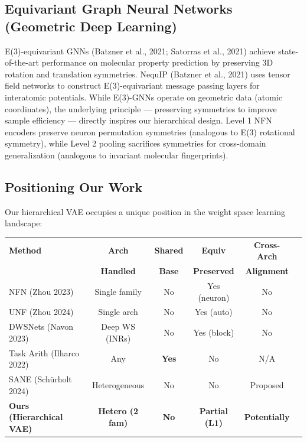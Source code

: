 \subsection{Equivariant Graph Neural Networks (Geometric Deep Learning)}

E(3)-equivariant GNNs (Batzner et al., 2021; Satorras et al., 2021) achieve state-of-the-art performance on molecular property prediction by preserving 3D rotation and translation symmetries. NequIP (Batzner et al., 2021) uses tensor field networks to construct E(3)-equivariant message passing layers for interatomic potentials. While E(3)-GNNs operate on geometric data (atomic coordinates), the underlying principle --- preserving symmetries to improve sample efficiency --- directly inspires our hierarchical design. Level 1 NFN encoders preserve neuron permutation symmetries (analogous to E(3) rotational symmetry), while Level 2 pooling sacrifices symmetries for cross-domain generalization (analogous to invariant molecular fingerprints).

\subsection{Positioning Our Work}

Our hierarchical VAE occupies a unique position in the weight space learning landscape:

\begin{table}[h]
\centering
\small
\begin{tabular}{lccccc}
\toprule
\textbf{Method} & \textbf{Arch} & \textbf{Shared} & \textbf{Equiv} & \textbf{Cross-Arch} \\
 & \textbf{Handled} & \textbf{Base} & \textbf{Preserved} & \textbf{Alignment} \\
\midrule
NFN (Zhou 2023) & Single family & No & Yes (neuron) & No \\
UNF (Zhou 2024) & Single arch & No & Yes (auto) & No \\
DWSNets (Navon 2023) & Deep WS (INRs) & No & Yes (block) & No \\
Task Arith (Ilharco 2022) & Any & \textbf{Yes} & No & N/A \\
SANE (Schürholt 2024) & Heterogeneous & No & No & Proposed \\
\textbf{Ours (Hierarchical VAE)} & \textbf{Hetero (2 fam)} & \textbf{No} & \textbf{Partial (L1)} & \textbf{Potentially} \\
\bottomrule
\end{tabular}
\end{table}

